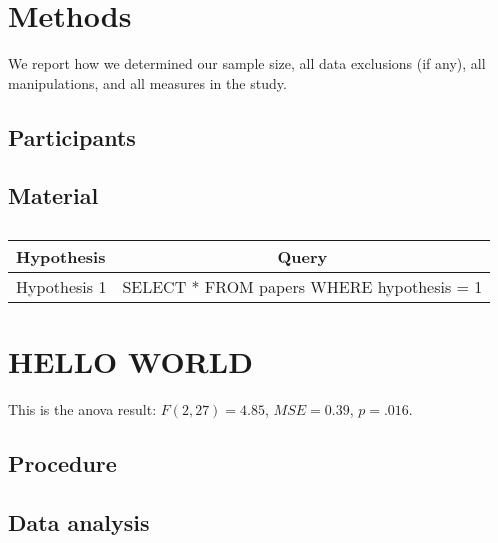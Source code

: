 \documentclass[
  stu, a4paper]{apa7}
\begin{document}
\section{Methods}\label{methods}

We report how we determined our sample size, all data exclusions (if any), all manipulations, and all measures in the study.

\subsection{Participants}\label{participants}

\subsection{Material}\label{material}

\begin{table}[tbp]

\begin{center}
\begin{threeparttable}

\caption{\label{tab:unnamed-chunk-4}}

\small{

\begin{tabular}{ll}
\toprule
Hypothesis & \multicolumn{1}{c}{Query}\\
\midrule
Hypothesis 1 & SELECT * FROM papers WHERE hypothesis = 1\\
\bottomrule
\end{tabular}

}

\end{threeparttable}
\end{center}

\end{table}

\section{HELLO WORLD}\label{hello-world}

This is the anova result: \(F(2, 27) = 4.85\), \(\mathit{MSE} = 0.39\), \(p = .016\).

\subsection{Procedure}\label{procedure}

\subsection{Data analysis}\label{data-analysis}
\end{document}
